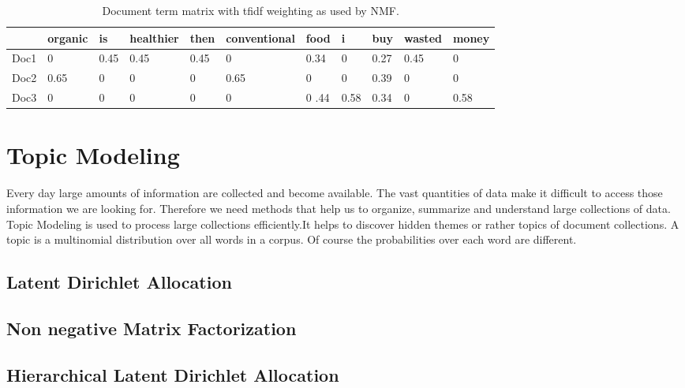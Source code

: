 \begin{table}[h]
	\begin{tabular}{lllllllllll}
		\toprule
		& organic & is & healthier & then & conventional & food & i &buy& wasted  & money \\ \midrule
	Doc1 & 0 	& 0.45  &   0.45      &  0.45   &  	0		 & 0.34  	& 0 &0.27  &  0.45   	&  0  \\
	Doc2 & 0.65 	& 0  &      0      &  0   & 0.65			 & 0  	& 0 &0.39  &  0   	&  0  \\
	Doc3 & 0 	& 0  &      0      &  0   & 0 			 & 0 .44 	& 0.58 &0.34  &  0    &  0.58   \\ \bottomrule
	\end{tabular}
	\caption[Sample \ac{tfidf} matrix]{Document term matrix with \ac{tfidf} weighting as used by \ac{NMF}.}
	\label{tab:doc_term_nmf}
\end{table}


\section{Topic Modeling}
\label{sec:topicmodel}
Every day large amounts of information are collected and become available. The vast quantities of data make it difficult to access those information we are looking for. Therefore we need methods that help us to organize, summarize and understand large collections of data.\\
Topic Modeling is used to process large collections efficiently.It helps to discover hidden themes or rather topics of document collections. A topic is a multinomial distribution over all words in a corpus. Of course the probabilities over each word are different. 



\subsection{Latent Dirichlet Allocation}




\subsection{Non negative Matrix Factorization}




\subsection{Hierarchical Latent Dirichlet Allocation}


